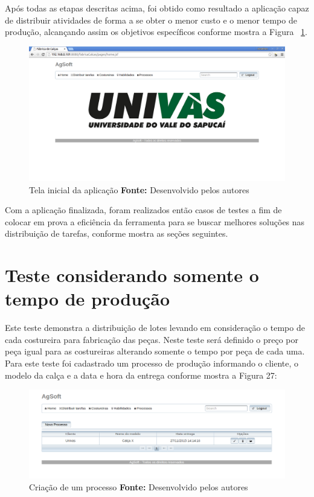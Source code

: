 \par Após todas as etapas descritas acima, foi obtido como resultado a aplicação
capaz de distribuir atividades de forma a se obter o menor custo e o menor tempo de produção, 
alcançando assim os objetivos específicos conforme mostra a Figura ~\ref{fig:tela_inicial_da_aplicação}.

\newpage

\begin{figure}[h!]
	\centerline{\includegraphics[scale=0.3]{./imagens/tela_inicial.png}}
	\caption[Tela inicial da aplicação]
	{Tela inicial da aplicação \textbf{Fonte:} Desenvolvido pelos autores}
	\label{fig:tela_inicial_da_aplicação}
\end{figure}


\par Com a aplicação finalizada, foram realizados então casos de testes a fim de colocar em prova a eficiência da ferramenta para se 
buscar melhores soluções nas distribuição de tarefas, conforme mostra as seções
seguintes.


\section{Teste considerando somente o tempo de produção}

\par Este teste demonstra a distribuição de lotes levando em consideração o
tempo de cada costureira para fabricação das peças. Neste teste será definido o
preço por peça igual para as costureiras alterando somente o tempo por peça de
cada uma. Para este teste foi cadastrado um processo de produção informando o
cliente, o modelo da calça e a data e hora da entrega conforme mostra a Figura 27:
\newpage

\begin{figure}[h!]
	\centerline{\includegraphics[scale=0.4]{./imagens/teste_processo.png}}
	\caption[Criação de um processo]
	{Criação de um processo \textbf{Fonte:} Desenvolvido pelos autores}
	\label{fig:exemplo1}
\end{figure}

